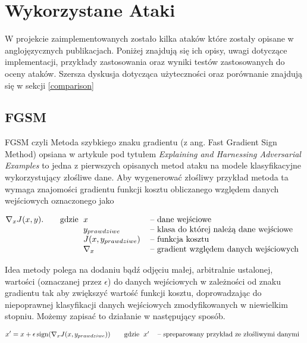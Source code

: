 \documentclass{article}
\begin{document}
\section{Wykorzystane Ataki}
W projekcie zaimplementowanych zostało kilka ataków które zostały opisane w anglojęzycznych publikacjach.
Poniżej znajdują się ich opisy, uwagi dotyczące implementacji, przykłady zastosowania oraz wyniki testów
zastosowanych do oceny ataków. Szersza dyskusja dotycząca użyteczności oraz porównanie znajdują się w sekcji \ref{comparison}

\subsection{FGSM}
    FGSM czyli Metoda szybkiego znaku gradientu (z ang. Fast Gradient Sign Method) opsiana w artykule
    pod tytułem \textit{Explaining and Harnessing Adversarial Examples}\cite{harnessing} to jedna z pierwszych
    opisanych metod ataku na modele klasyfikacyjne wykorzystujący złośliwe dane.
    Aby wygenerować złośliwy przykład metoda ta wymaga znajomości gradientu funkcji kosztu obliczanego względem danych
    wejściowych oznaczonego jako

    \begin{equation}
        \nabla_{x} J(x, y).
        \qquad\text{gdzie}
        \begin{tabular}[t]{ll}
        $x$   & -- dane wejściowe \\
        $y_{prawdziwe}$   & -- klasa do której należą dane wejściowe\\
        $J(x, y_{prawdziwe})$  & -- funkcja kosztu \\
        $\nabla_{x}$  & -- gradient względem danych wejściowych \\
        \end{tabular}
    \end{equation}

    Idea metody polega na dodaniu bądź odjęciu małej, arbitralnie ustalonej, wartości (oznaczanej przez \(\epsilon\)) do
    danych wejściowych w zależności od znaku gradientu tak aby zwiększyć wartość funkcji kosztu,
    doprowadzając do niepoprawnej klasyfikacji danych wejściowych zmodyfikowanych w niewielkim stopniu.
    Możemy zapisać to działanie w następujący sposób.

    \begin{equation}
    x' = x + \epsilon\operatorname{sign}(\nabla_{x} J(x, y_{prawdziwe}))
    \qquad\text{gdzie}
    \begin{tabular}[t]{ll}
    $x'$  & -- spreparowany przykład ze złośliwymi danymi \\
    \end{tabular}
    \end{equation}
\end{document}
